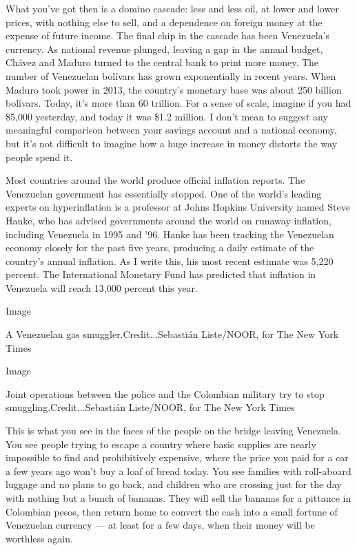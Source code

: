 What you've got then is a domino cascade: less and less oil, at lower
and lower prices, with nothing else to sell, and a dependence on foreign
money at the expense of future income. The final chip in the cascade has
been Venezuela's currency. As national revenue plunged, leaving a gap in
the annual budget, Chávez and Maduro turned to the central bank to print
more money. The number of Venezuelan bolívars has grown exponentially in
recent years. When Maduro took power in 2013, the country's monetary
base was about 250 billion bolívars. Today, it's more than 60 trillion.
For a sense of scale, imagine if you had \$5,000 yesterday, and today it
was \$1.2 million. I don't mean to suggest any meaningful comparison
between your savings account and a national economy, but it's not
difficult to imagine how a huge increase in money distorts the way
people spend it.

Most countries around the world produce official inflation reports. The
Venezuelan government has essentially stopped. One of the world's
leading experts on hyperinflation is a professor at Johns Hopkins
University named Steve Hanke, who has advised governments around the
world on runaway inflation, including Venezuela in 1995 and '96. Hanke
has been tracking the Venezuelan economy closely for the past five
years, producing a daily estimate of the country's annual inflation. As
I write this, his most recent estimate was 5,220 percent. The
International Monetary Fund has predicted that inflation in Venezuela
will reach 13,000 percent this year.

Image

A Venezuelan gas smuggler.Credit...Sebastián Liste/NOOR, for The New
York Times

Image

Joint operations between the police and the Colombian military try to
stop smuggling.Credit...Sebastián Liste/NOOR, for The New York Times

This is what you see in the faces of the people on the bridge leaving
Venezuela. You see people trying to escape a country where basic
supplies are nearly impossible to find and prohibitively expensive,
where the price you paid for a car a few years ago won't buy a loaf of
bread today. You see families with roll-aboard luggage and no plans to
go back, and children who are crossing just for the day with nothing but
a bunch of bananas. They will sell the bananas for a pittance in
Colombian pesos, then return home to convert the cash into a small
fortune of Venezuelan currency --- at least for a few days, when their
money will be worthless again.


